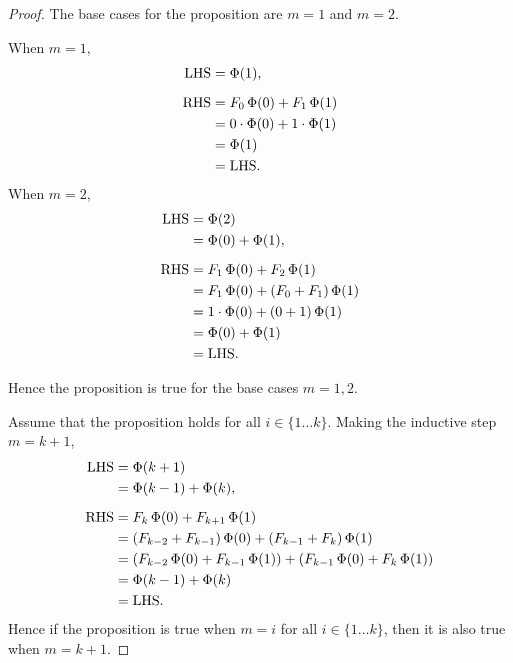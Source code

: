 \begin{enumerate}
\begin{enumerate}
                \begin{proof}
                    The base cases for the proposition are $m = 1$ and $m = 2$.

                    When $m = 1$,
                    \begin{align*}
                        \text{LHS} &= \Phi(1), \\[2\jot]
                        \text{RHS} &= F_0 \, \Phi(0) + F_1 \, \Phi(1) \\
                        &= 0 \cdot \Phi(0) + 1 \cdot \Phi(1) \\
                        &= \Phi(1) \\
                        &= \text{LHS}.
                    \end{align*}
                    When $m = 2$,
                    \begin{align*}
                        \text{LHS} &= \Phi(2) \\
                        &= \Phi(0) + \Phi(1), \\[2\jot]
                        \text{RHS} &= F_1 \, \Phi(0) + F_2 \, \Phi(1) \\
                        &= F_1 \, \Phi(0) + (F_0 + F_1) \, \Phi(1) \\
                        &= 1 \cdot \Phi(0) + (0 + 1) \, \Phi(1) \\
                        &= \Phi(0) + \Phi(1) \\
                        &= \text{LHS}.
                    \end{align*}

                    Hence the proposition is true for the base cases $m = 1, 2$.

                    Assume that the proposition holds for all $i \in \{1 \ldots k\}$.
                    Making the inductive step $m = k + 1$,
                    \begin{align*}
                        \text{LHS} &= \Phi(k + 1) \\
                        &= \Phi(k - 1) + \Phi(k), \\[2\jot]
                        \text{RHS} &= F_k \, \Phi(0) + F_{k + 1} \, \Phi(1) \\
                        &= (F_{k - 2} + F_{k - 1}) \, \Phi(0) + (F_{k - 1} + F_k) \, \Phi(1) \\
                        &= (F_{k - 2} \, \Phi(0) + F_{k - 1} \, \Phi(1)) + (F_{k - 1} \, \Phi(0) + F_k \, \Phi(1)) \\
                        &= \Phi(k - 1) + \Phi(k) \\
                        &= \text{LHS}.
                    \end{align*}
                    Hence if the proposition is true when $m = i$ for all $i \in \{1 \ldots k\}$, then it is also true when $m = k + 1$.


\end{proof}
\end{enumerate}
\end{enumerate}
